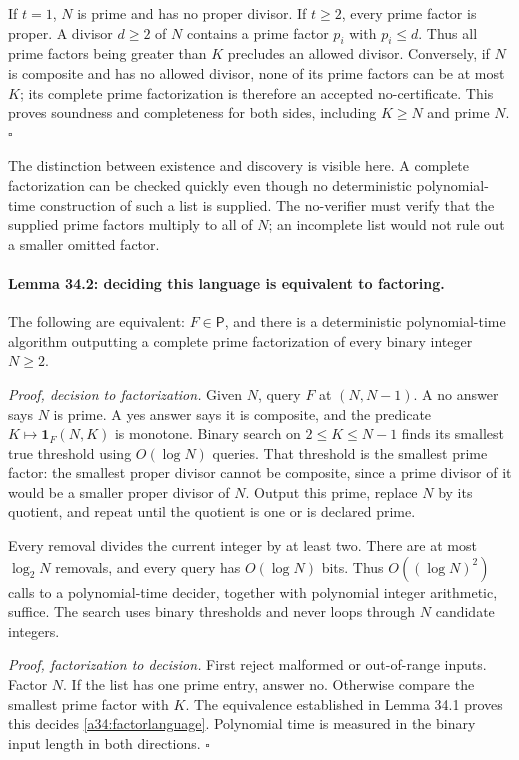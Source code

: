 \documentclass[11pt]{article}
\begin{document}
If $t=1$, $N$ is prime and has no proper divisor. If $t\ge2$, every prime
factor is proper. A divisor $d\ge2$ of $N$ contains a prime factor $p_i$
with $p_i\le d$. Thus all prime factors being greater than $K$ precludes
an allowed divisor. Conversely, if $N$ is composite and has no allowed
divisor, none of its prime factors can be at most $K$; its complete prime
factorization is therefore an accepted no-certificate. This proves soundness
and completeness for both sides, including $K\ge N$ and prime $N$.
\hfill$\square$

The distinction between existence and discovery is visible here. A complete
factorization can be checked quickly even though no deterministic
polynomial-time construction of such a list is supplied. The no-verifier
must verify that the supplied prime factors multiply to all of $N$;
an incomplete list would not rule out a smaller omitted factor.

\paragraph{Lemma 34.2: deciding this language is equivalent to factoring.}
The following are equivalent: $F\in\mathsf P$, and there is a deterministic
polynomial-time algorithm outputting a complete prime factorization of every
binary integer $N\ge2$.

\emph{Proof, decision to factorization.} Given $N$, query $F$ at $(N,N-1)$.
A no answer says $N$ is prime. A yes answer says it is composite, and the
predicate $K\mapsto\mathbf1_F(N,K)$ is monotone. Binary search on
$2\le K\le N-1$ finds its smallest true threshold using $O(\log N)$
queries. That threshold is the smallest prime factor: the smallest proper
divisor cannot be composite, since a prime divisor of it would be a smaller
proper divisor of $N$. Output this prime, replace $N$ by its quotient, and
repeat until the quotient is one or is declared prime.

Every removal divides the current integer by at least two. There are at
most $\log_2 N$ removals, and every query has $O(\log N)$ bits. Thus
$O((\log N)^2)$ calls to a polynomial-time decider, together with polynomial
integer arithmetic, suffice. The search uses binary thresholds and never
loops through $N$ candidate integers.

\emph{Proof, factorization to decision.} First reject malformed or out-of-range
inputs. Factor $N$. If the list has one prime entry, answer no. Otherwise
compare the smallest prime factor with $K$. The equivalence established
in Lemma 34.1 proves this decides \eqref{a34:factorlanguage}. Polynomial
time is measured in the binary input length in both directions.
\hfill$\square$
\end{document}
